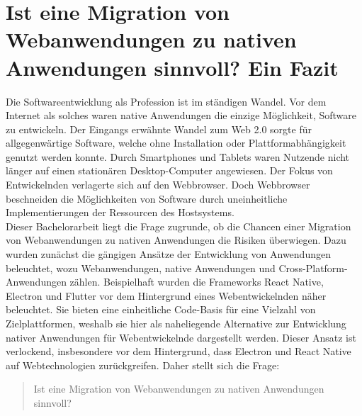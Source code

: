 \documentclass[a4paper]{scrartcl}
\begin{document}
\newpage

\section{Ist eine Migration von Webanwendungen zu nativen Anwendungen sinnvoll? Ein Fazit}
Die Softwareentwicklung als Profession ist im ständigen Wandel. Vor dem Internet als solches waren native Anwendungen die einzige Möglichkeit, Software zu entwickeln. Der Eingangs erwähnte Wandel zum Web 2.0 sorgte für allgegenwärtige Software, welche ohne Installation oder Plattformabhängigkeit genutzt werden konnte. Durch Smartphones und Tablets waren Nutzende nicht länger auf einen stationären Desktop-Computer angewiesen. Der Fokus von Entwickelnden verlagerte sich auf den Webbrowser. Doch Webbrowser beschneiden die Möglichkeiten von Software durch uneinheitliche Implementierungen der Ressourcen des Hostsystems. \\
Dieser Bachelorarbeit liegt die Frage zugrunde, ob die Chancen einer Migration von Webanwendungen zu nativen Anwendungen die Risiken überwiegen. Dazu wurden zunächst die gängigen Ansätze der Entwicklung von Anwendungen beleuchtet, wozu Webanwendungen, native Anwendungen und Cross-Platform-Anwendungen zählen. Beispielhaft wurden die Frameworks React Native, Electron und Flutter vor dem Hintergrund eines Webentwickelnden näher beleuchtet. Sie bieten eine einheitliche Code-Basis für eine Vielzahl von Zielplattformen, weshalb sie hier als naheliegende Alternative zur Entwicklung nativer Anwendungen für Webentwickelnde dargestellt werden. Dieser Ansatz ist verlockend, insbesondere vor dem Hintergrund, dass Electron und React Native auf Webtechnologien zurückgreifen. Daher stellt sich die Frage: 

\begin{quote}
	Ist eine Migration von Webanwendungen zu nativen Anwendungen sinnvoll?	
\end{quote}
\end{document}
